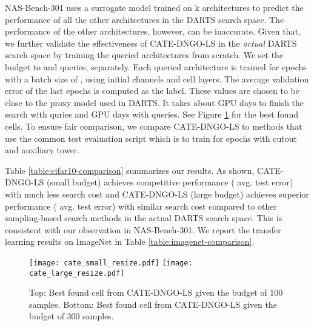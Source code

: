 NAS-Bench-301 uses a surrogate model trained on k architectures to predict the performance of all the other architectures in the DARTS search space. The performance of the other architectures, however, can be inaccurate. Given that, we further validate the effectiveness of CATE-DNGO-LS in the \textit{actual} DARTS search space by training the queried architectures from scratch. We set the budget to  and  queries, separately. Each queried architecture is trained for  epochs with a batch size of , using  initial channels and  cell layers. The average validation error of the last  epochs is computed as the label. These values are chosen to be close to the proxy model used in DARTS. It takes about  GPU days to finish the search with  quries and  GPU days with  queries. See Figure \ref{fig:cell} for the best found cells. To ensure fair comparison, we compare CATE-DNGO-LS to methods \cite{liu2018darts,Li2019RandomSA,yan2020arch,white2019bananas} that use the common test evaluation script which is to train for  epochs with cutout and auxiliary tower. 

Table \ref{table:cifar10-comparison} summarizes our results.
As shown, CATE-DNGO-LS (small budget) achieves competitive performance ( avg. test error) with much less search cost and CATE-DNGO-LS (large budget) achieves superior performance ( avg. test error) with similar search cost compared to other sampling-based search methods \cite{yan2020arch,white2019bananas} in the actual DARTS search space. This is consistent with our observation in NAS-Bench-301. We report the transfer learning results on ImageNet \cite{imagenet_cvpr09} in Table \ref{table:imagenet-comparison}. 



\begin{figure}[t]
	\centering
	\texttt{[image: cate\_small\_resize.pdf]}
	\texttt{[image: cate\_large\_resize.pdf]}
\caption{
    Top: Best found cell from CATE-DNGO-LS given the budget of 100 samples. 
	Bottom: Best found cell from CATE-DNGO-LS given the budget of 300 samples. 
	}
	\label{fig:cell}
\end{figure}



